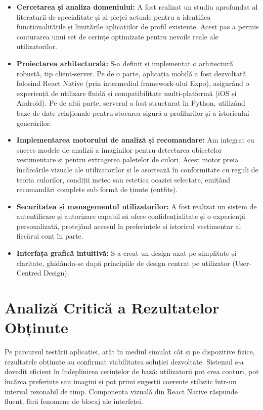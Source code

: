 \begin{itemize}
    \item \textbf{Cercetarea și analiza domeniului:} A fost realizat un studiu aprofundat al literaturii de specialitate și al pieței actuale pentru a identifica funcționalitățile și limitările aplicațiilor de profil existente. Acest pas a permis conturarea unui set de cerințe optimizate pentru nevoile reale ale utilizatorilor.
    \item \textbf{Proiectarea arhitecturală:} S-a definit și implementat o arhitectură robustă, tip client-server. Pe de o parte, aplicația mobilă a fost dezvoltată folosind React Native (prin intermediul framework-ului Expo), asigurând o experiență de utilizare fluidă și compatibilitate multi-platformă (iOS și Android). Pe de altă parte, serverul a fost structurat în Python, utilizând baze de date relaționale pentru stocarea sigură a profilurilor și a istoricului generărilor.
    \item \textbf{Implementarea motorului de analiză și recomandare:} Am integrat cu succes modele de analiză a imaginilor pentru detectarea obiectelor vestimentare și pentru extragerea paletelor de culori. Acest motor preia încărcările vizuale ale utilizatorilor și le asortează în conformitate cu reguli de teoria culorilor, condiții meteo sau estetica ocaziei selectate, emițând recomandări complete sub formă de ținute (outfits).
    \item \textbf{Securitatea și managementul utilizatorilor:} A fost realizat un sistem de autentificare și autorizare capabil să ofere confidențialitate și o experiență personalizată, protejând accesul la preferințele și istoricul vestimentar al fiecărui cont în parte.
    \item \textbf{Interfața grafică intuitivă:} S-a creat un design axat pe simplitate și claritate, ghidându-se după principiile de design centrat pe utilizator (User-Centred Design). 
\end{itemize}

\section{Analiză Critică a Rezultatelor Obținute}

Pe parcursul testării aplicației, atât în mediul simulat cât și pe dispozitive fizice, rezultatele obținute au confirmat viabilitatea soluției dezvoltate. Sistemul s-a dovedit eficient în îndeplinirea cerințelor de bază: utilizatorii pot crea conturi, pot încărca preferințe sau imagini și pot primi sugestii coerente stilistic într-un interval rezonabil de timp. Componenta vizuală din React Native răspunde fluent, fără fenomene de blocaj ale interfeței.

